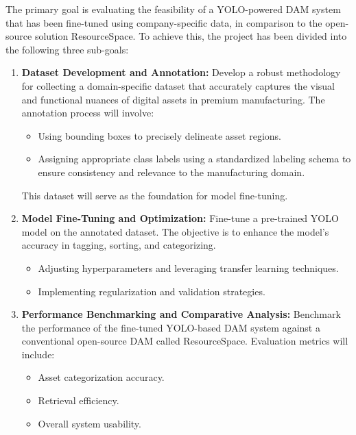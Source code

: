\documentclass[a4paper,10pt,twocolumn]{article}
\numberwithin{figure}{section}
\numberwithin{table}{section}
\begin{document}

The primary goal is evaluating the feasibility of a YOLO-powered DAM
system that has been fine-tuned using company-specific data, 
in comparison to the open-source solution ResourceSpace.
To achieve this, the project has been divided into the following three sub-goals:

\begin{enumerate} 
    
    \item \textbf{Dataset Development and Annotation:}
    Develop a robust methodology for collecting a domain-specific dataset that 
    accurately captures the visual and functional nuances of digital assets 
    in premium manufacturing. The annotation process will involve: 
    \begin{itemize} 
        \item Using bounding boxes to precisely delineate asset regions. 
        \item Assigning appropriate class labels using a standardized labeling schema 
        to ensure consistency and relevance to the manufacturing domain. 
    \end{itemize}
    
    This dataset will serve as the foundation for model fine-tuning.

    \item \textbf{Model Fine-Tuning and Optimization:}  
    Fine-tune a pre-trained YOLO model on the annotated dataset. 
    The objective is to enhance the model’s 
    accuracy in tagging, sorting, and categorizing.
    \begin{itemize}
        \item Adjusting hyperparameters and leveraging transfer learning techniques.
        \item Implementing regularization and validation strategies.
    \end{itemize}

    \item \textbf{Performance Benchmarking and Comparative Analysis:}  
    Benchmark the performance of the fine-tuned YOLO-based DAM system against a 
    conventional open-source DAM called ResourceSpace. Evaluation metrics will include:
    \begin{itemize}
        \item Asset categorization accuracy.
        \item Retrieval efficiency.
        \item Overall system usability.
    \end{itemize}
\end{enumerate}
\end{document}
